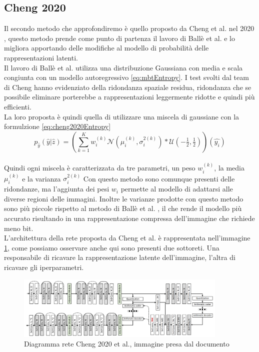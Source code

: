 \subsection{Cheng 2020}
Il secondo metodo che approfondiremo è quello proposto da Cheng et al. nel 2020 \cite{cheng2020learned}, questo metodo prende come punto di partenza il lavoro di Ballè et al. \cite{minnen2018joint} e lo migliora apportando delle modifiche al modello di probabilità delle rappresentazioni latenti.\\
Il lavoro di Ballè et al. \cite{minnen2018joint} utilizza una distribuzione Gaussiana con media e scala congiunta con un modello autoregressivo \ref{eq:mbtEntropy}. I test svolti dal team di Cheng hanno evidenziato della ridondanza spaziale residua, ridondanza che se possibile eliminare porterebbe a rappresentazioni leggermente ridotte e quindi più efficienti.\\
La loro proposta è quindi quella di utilizzare una miscela di gaussiane con la formulzione \ref{eq:cheng2020Entropy}
\begin{equation}\label{eq:cheng2020Entropy}
    p_{\hat{y}}(\hat{y}|\hat{z}) = (\sum_{k=1}^{K} w_{i}^{(k)} \mathcal{N}(\mu_{i}^{(k)},\sigma_{i}^{2(k)})*\mathcal{U}(-\tfrac{1}{2},\tfrac{1}{2}))(\hat{y_{i}})
\end{equation}\\
Quindi ogni miscela è caratterizzata da tre parametri, un peso $w_{i}^{(k)}$, la media $\mu_{i}^{(k)}$ e la varianza $\sigma_{i}^{2(k)}$
Con questo metodo sono comunque presenti delle ridondanze, ma l’aggiunta dei pesi $w_{i}$ permette al modello di adattarsi alle diverse regioni delle immagini. Inoltre le varianze prodotte con questo metodo sono più piccole rispetto al metodo di Ballè et al. \cite{minnen2018joint}, il che rende il modello più accurato risultando in una rappresentazione compressa dell’immagine che richiede meno bit.\\
L’architettura della rete proposta da Cheng et al. è rappresentata nell’immagine \ref{fig:cheng2020Network}, come possiamo osservare anche qui sono presenti due sottoreti. Una responsabile di ricavare la rappresentazione latente dell’immagine, l’altra di ricavare gli iperparametri.\\
\begin{figure}[!h]
    \centering
    \includegraphics[width=0.9\textwidth]{Immagini/Cheng2020_Rete.png}
    \caption{Diagramma rete Cheng 2020 et al., immagine presa dal documento \cite{cheng2020learned}}
    \label{fig:cheng2020Network}
\end{figure}\\

